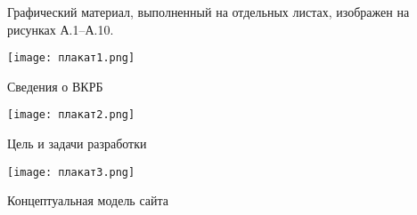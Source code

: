 
Графический материал, выполненный на отдельных листах,
изображен на рисунках А.1--А.10.

\renewcommand{\thefigure}{А.\arabic{figure}} %

\begin{плакат}
    \texttt{[image: плакат1.png]}
    \caption{Сведения о ВКРБ}
    \label{pl1:image}      
\end{плакат}

\begin{плакат}
    \texttt{[image: плакат2.png]}
    \caption{Цель и задачи разработки}
    \label{pl2:image}      
\end{плакат}

\begin{плакат}
    \texttt{[image: плакат3.png]}
    \caption{Концептуальная модель сайта}
    \label{pl3:image}      
\end{плакат}



